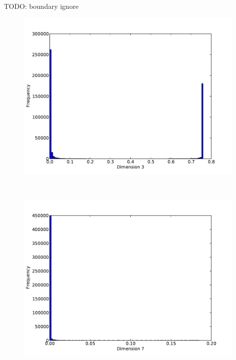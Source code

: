 TODO: boundary ignore

\begin{figure}
	\begin{center}
		\begin{subfloat}{%
			\includegraphics[scale=0.25]{figures/histograms/astrophysics_500000_2.pdf}
		}
		\end{subfloat}~
		\begin{subfloat}{%
			\includegraphics[scale=0.25]{figures/histograms/astrophysics_500000_6.pdf}
		}
		\end{subfloat}

\end{center}
\end{figure}
